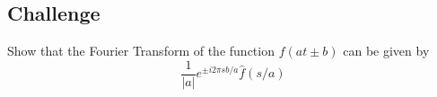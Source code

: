 \subsection*{Challenge}
Show that the Fourier Transform of the function $f(at\pm b)$ can be given by
\begin{equation}
    \frac{1}{|a|} e^{\pm i 2 \pi s b/a} \hat{f}(s/a)
\end{equation}










